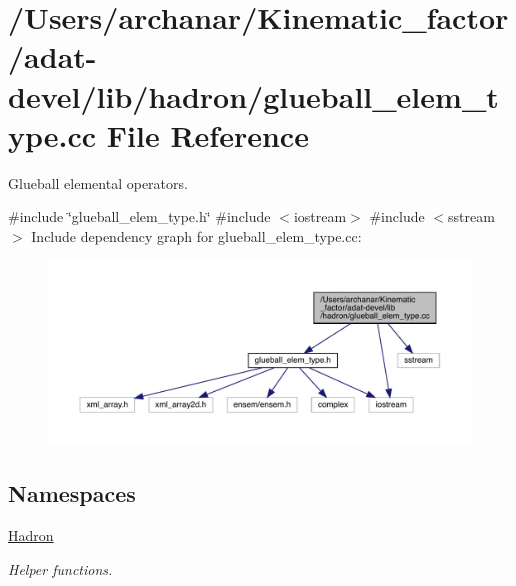 \hypertarget{adat-devel_2lib_2hadron_2glueball__elem__type_8cc}{}\section{/\+Users/archanar/\+Kinematic\+\_\+factor/adat-\/devel/lib/hadron/glueball\+\_\+elem\+\_\+type.cc File Reference}
\label{adat-devel_2lib_2hadron_2glueball__elem__type_8cc}


Glueball elemental operators.  


{\ttfamily \#include \char`\"{}glueball\+\_\+elem\+\_\+type.\+h\char`\"{}}\newline
{\ttfamily \#include $<$iostream$>$}\newline
{\ttfamily \#include $<$sstream$>$}\newline
Include dependency graph for glueball\+\_\+elem\+\_\+type.\+cc\+:
\nopagebreak
\begin{figure}[H]
\begin{center}
\leavevmode
\includegraphics[width=350pt]{d3/dc4/adat-devel_2lib_2hadron_2glueball__elem__type_8cc__incl}
\end{center}
\end{figure}
\subsection*{Namespaces}
\begin{DoxyCompactItemize}
\item 
 \mbox{\hyperlink{namespaceHadron}{Hadron}}
\begin{DoxyCompactList}\small\item\em Helper functions. \end{DoxyCompactList}\end{DoxyCompactItemize}
